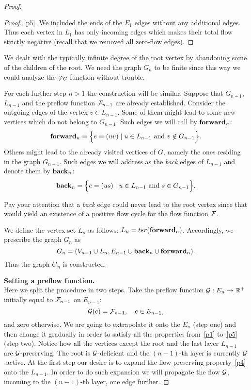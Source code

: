 \documentclass[12pt]{amsart}
\begin{document}
\begin{proof}
\begin{proof}
        \noindent \ref{p5}. We included the ends of the $E_1$ edges without any additional edges.
        Thus each vertex in $L_1$ has only incoming edges which makes their
          total flow strictly negative (recall that we removed all zero-flow edges).
      \end{proof}
      \begin{note}
        We dealt with the typically infinite degree of the root vertex by abandoning some of the children of the root.
        We need the graph $G_n$ to be finite since this way we could analyze the $\gfi$ function without trouble.
      \end{note}
      For each further step $n > 1$ the construction will be similar.
      Suppose that $G_{n-1}$, $L_{n-1}$ and the preflow function $\flowposn{n-1}$ are already established.
      Consider the outgoing edges of the vertex $v \in L_{n-1}$.
      Some of them might lead to some new vertices which do not belong to $G_{n-1}$.
      Such edges we will call by $\efor_n$:
      \[
        \efor_n = \Big\{ e = (uv) \mid u \in L_{n-1} \text{ and } v \notin G_{n-1}\Big\}.
      \]
      Others might lead to the already visited vertices of $G$, namely the ones residing in the graph $G_{n-1}$.
      Such edges we will address as the \emph{back} edges of $L_{n-1}$ and denote them by $\eback_n$:
      \[
        \eback_n = \Big\{e = (us) \mid u \in L_{n-1} \text{ and } s \in G_{n-1}\Big\}.
      \]
      \begin{remark}
        Pay your attention that a \emph{back} edge could never lead to the root vertex since that
          would yield an existence of a positive flow cycle for the flow function $\flowpos$.
      \end{remark}
      We define the vertex set $L_n$ as follows: $L_n = \ter(\efor_n)$.
      Accordingly, we prescribe the graph $G_n$ as
      \[
        G_n = (V_{n-1} \cup L_n, E_{n-1} \cup \eback_n \cup \efor_n).
      \]
      Thus the graph $G_n$ is constructed.

      \noindent\textbf{Setting a preflow function.}\\
      \noindent Here we split the procedure in two steps.
      Take the preflow function $\cal{G}: E_n \to \mathbb{R}^{+}$ initially equal to $\flowposn{n-1}$ on $E_{n-1}$:
      \[
        \cal{G}(e) = \flowposn{n-1}, \quad e \in E_{n-1},
      \]
      and zero otherwise.
      We are going to extrapolate it onto the $E_n$ (step one) and then change it gradually in order
        to satisfy all the properties from~\ref{p1} to~\ref{p5} (step two).
      Notice how all the vertices except the root and the last layer $L_{n-1}$ are $\cal{G}$-preserving.
      The root is $\cal{G}$-deficient and the $(n-1)$-th layer is currently $\cal{G}$-active.
      At the first step our desire is to expand the flow-preserving property~\ref{p4} onto the $L_{n-1}$.
      In order to do such expansion we will propagate the flow $\cal{G}$, incoming to the $(n-1)$-th layer, one edge further.


\end{proof}
\end{document}
